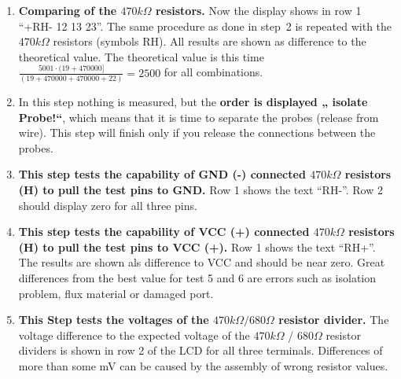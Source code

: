 \begin{enumerate}
\item {\bf Comparing of the \(470k\Omega\) resistors.}
Now the display shows in row 1 ``+RH- 12 13 23''. The same procedure as done in step~2 is repeated with the \(470k\Omega\) resistors (symbols RH).
All results are shown as difference to the theoretical value.
The theoretical value is this time \(\frac{5001 \cdot (19 + 470000]}{ (19 + 470000 + 470000 + 22)} = 2500\) for all combinations.

\item In this step nothing is measured, but the {\bf order is displayed „ isolate Probe!“},
which means that it is time to separate the probes (release from wire).
This step will finish only if you release the connections between the probes.

\item {\bf This step tests the capability of GND (-) connected \(470k\Omega\) resistors (H) to pull the test pins to GND.}
Row 1 shows the text  ``RH-''.
Row 2 should display zero for all three pins.

\item {\bf This step tests the capability of VCC (+) connected \(470k\Omega\) resistors (H) to pull the test pins  to VCC (+).}
Row 1 shows the text ``RH+''.
The results are shown als difference to VCC and should be near zero.
 Great differences from the best value for test 5 and 6 are errors  such as isolation problem, flux material or damaged port.

\item {\bf This Step tests the voltages of the \(470k\Omega / 680\Omega\)  resistor divider.}
The voltage difference to the expected voltage of the \(470k\Omega\) / \(680\Omega\) resistor dividers is shown
in row 2 of the LCD for all three terminals.
Differences of more than some mV can be caused by the assembly of wrong resistor values.


\end{enumerate}
